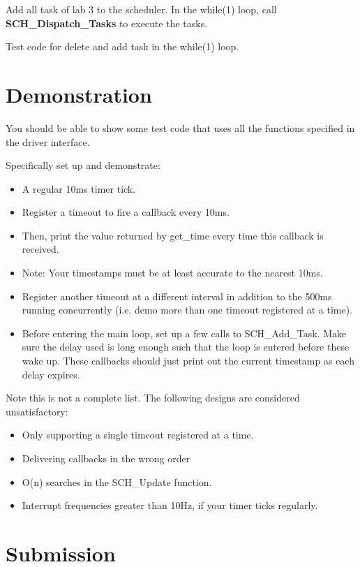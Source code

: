 \documentclass[twoside, final]{hcmut_report}
\begin{document}
Add all task of lab 3 to the scheduler. In the while(1) loop, call \textbf{SCH\_Dispatch\_Tasks} to execute the tasks.

Test code for delete and add task in the while(1) loop.

\section{Demonstration}

You should be able to show some test code that uses all the functions specified in the driver interface.

Specifically set up and demonstrate:
\begin{itemize}
    \item A regular 10ms timer tick. 
    \item Register a timeout to fire a callback every 10ms.     
    \item Then, print the value returned by get\_time every time this callback is received. 
     \item Note: Your timestamps must be at least accurate to the nearest 10ms.
     \item Register another timeout at a different interval in addition to the 500ms running concurrently (i.e. demo more than one timeout registered at a time).
     \item Before entering the main loop, set up a few calls to SCH\_Add\_Task. Make sure the delay used is long enough such that the loop is entered before these wake up. These callbacks should just print out the current timestamp as each delay expires.

\end{itemize}




Note this is not a complete list. The following designs are considered unsatisfactory:
\begin{itemize}
    \item Only supporting a single timeout registered at a time.
    \item Delivering callbacks in the wrong order
    \item O(n) searches in the SCH\_Update function.
    \item Interrupt frequencies greater than 10Hz, if your timer ticks regularly.
\end{itemize}





\section{Submission}
\end{document}
